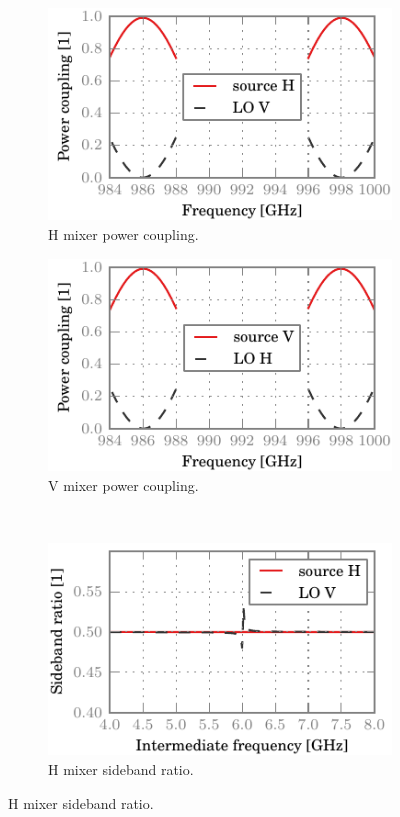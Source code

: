 \begin{figure}[hbtp]
    \centering
    \begin{subfigure}[b]{.5\textwidth}
        \includegraphics{chapter_3/0_ideal_h_dsb}%
        \caption{H mixer power coupling.}
    \end{subfigure}%
    \begin{subfigure}[b]{.5\textwidth}
        \includegraphics{chapter_3/0_ideal_v_dsb}%
        \caption{V mixer power coupling.}
    \end{subfigure}%
    \\
    \begin{subfigure}[b]{.5\textwidth}
        \includegraphics{chapter_3/0_ideal_h_sbr}%
        \caption{H mixer sideband ratio.}
    \end{subfigure}%

\end{figure}
